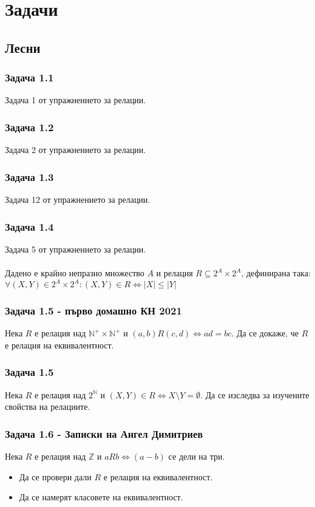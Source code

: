 \documentclass[12pt]{article}
\begin{document}
\section*{Задачи}

\subsection*{Лесни}
\subsubsection*{Задача 1.1}
Задача 1 от упражнението за релации.
\subsubsection*{Задача 1.2}
Задача 2 от упражнението за релации.
\subsubsection*{Задача 1.3}
Задача 12 от упражнението за релации.
\subsubsection*{Задача 1.4}
Задача 5 от упражнението за релации.
\paragraph*{}
Дадено е крайно непразно множество $A$ и релация $R \subseteq 2^A \times 2^A$, дефинирана така:
$\forall (X, Y) \in 2^A \times 2^A: (X, Y) \in R \iff |X| \leq |Y|$
\subsubsection*{Задача 1.5 - първо домашно КН 2021}
Нека $R$ е релация над $\mathbb{N}^+ \times \mathbb{N}^+$ и $(a, b)R(c, d) \iff ad=bc$. Да се докаже, че $R$ е релация на еквивалентност.
\subsubsection*{Задача 1.5}
Нека $R$ е релация над $2^\mathbb{N}$ и $(X, Y) \in R \iff X \setminus Y = \emptyset$. Да се изследва за изучените свойства на релациите.
\subsubsection*{Задача 1.6 - Записки на Ангел Димитриев}
Нека $R$ е релация над $\mathbb{Z}$ и $aRb \iff (a-b)$ се дели на три.
\begin{itemize}
    \item Да се провери дали $R$ е релация на еквивалентност.
    \item Да се намерят класовете на еквивалентност.
\end{itemize}
\end{document}
